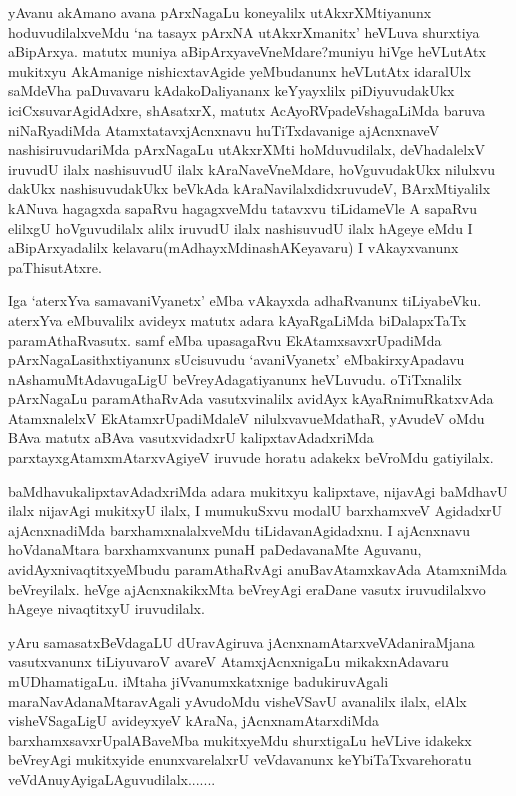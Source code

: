 \begin{artha}
yAvanu akAmano avana pArxNagaLu koneyalilx utAkxrXMtiyanunx hoduvudilalxveMdu `na tasayx pArxNA utAkxrXmanitx' heVLuva shurxtiya aBipArxya. matutx muniya aBipArxyaveVneMdare?\break muniyu hiVge heVLutAtx mukitxyu AkAmanige nishicxtavAgide yeMbudanunx heVLutAtx idaralUlx saMdeVha paDuvavaru kAdakoDaliyananx keYyayxlilx piDiyuvudakUkx iciCxsuvarAgidAdxre, shAsatxrX, matutx AcAyoRVpadeVshagaLiMda baruva niNaRyadiMda AtamxtatavxjAcnxnavu huTiTxdavanige ajAcnxnaveV nashisiruvudariMda pArxNagaLu utAkxrXMti hoMduvudilalx, deVhadalelxV iruvudU ilalx nashisuvudU ilalx kAraNaveVneMdare, hoVguvudakUkx nilulxvu dakUkx nashisuvudakUkx beVkAda kAraNavilalxdidxruvudeV, BArxMtiyalilx kANuva hagagxda sapaRvu hagagxveMdu tatavxvu tiLidameVle A sapaRvu elilxgU hoVguvudilalx alilx iruvudU ilalx nashisuvudU ilalx hAgeye eMdu I aBipArxyadalilx kelavaru(mAdhayxMdinashAKeyavaru) I vAkayxvanunx paThisutAtxre.
\end{artha}

\begin{artha}
Iga `aterxYva samavaniVyanetx' eMba vAkayxda adhaRvanunx tiLiyabeVku. aterxYva eMbuvalilx avideyx matutx adara kAyaRgaLiMda biDalapxTaTx paramAthaRvasutx. samf eMba upasagaRvu EkAtamxsavxrUpa\-\break diMda pArxNagaLasithxtiyanunx sUcisuvudu `avaniVyanetx' eMba\break kirxyApadavu nAshamuMtAdavugaLigU beVreyAdagatiyanunx heVLuvudu. oTiTxnalilx pArxNagaLu paramAthaRvAda vasutxvinalilx avidAyx kAyaRnimuRkatxvAda AtamxnalelxV EkAtamxrUpadiMdaleV nilulxvavu\break eMdathaR, yAvudeV oMdu BAva matutx aBAva vasutxvidadxrU kalipxtavAdadxriMda parxtayxgAtamxmAtarxvAgiyeV iruvude horatu adakekx beVroMdu gatiyilalx. 
\end{artha}


\begin{artha}
baMdhavukalipxtavAdadxriMda adara mukitxyu kalipxtave, nijavAgi baMdhavU ilalx nijavAgi mukitxyU ilalx, I mumukuSxvu modalU barxhamxveV AgidadxrU ajAcnxnadiMda barxhamxnalalxveMdu tiLidavanAgidadxnu. I ajAcnxnavu hoVdanaMtara barxhamxvanunx punaH paDedavanaMte Aguvanu, avidAyxnivaqtitxyeMbudu paramAthaRvAgi anuBavAtamxkavAda AtamxniMda beVreyilalx. heVge ajAcnxnakikxMta beVreyAgi eraDane vasutx iruvudilalxvo hAgeye nivaqtitxyU iruvudilalx.
\end{artha}

\begin{artha}
yAru samasatxBeVdagaLU dUravAgiruva jAcnxnamAtarxveV\break AdaniraMjana vasutxvanunx tiLiyuvaroV avareV AtamxjAcnxnigaLu mikakxnAdavaru mUDhamatigaLu. iMtaha jiVvanumxkatxnige badukiruvAgali maraNavAdanaMtaravAgali yAvudoMdu visheVSavU avanalilx ilalx, elAlx visheVSagaLigU avideyxyeV kAraNa, jAcnxnamAtarxdiMda barxhamx\-\break savxrUpalABaveMba mukitxyeMdu shurxtigaLu heVLive idakekx beVreyAgi mukitxyide enunxvarelalxrU veVdavanunx keYbiTaTxvarehoratu veVdAnuyAyigaLAguvudilalx.......
\end{artha}

